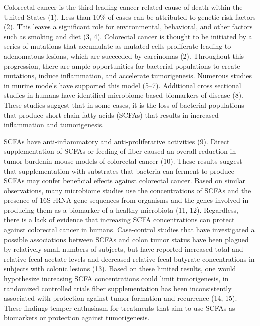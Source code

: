 \documentclass[11pt,]{article}
\begin{document}
\newpage

Colorectal cancer is the third leading cancer-related cause of death
within the United States (1). Less than 10\% of cases can be attributed
to genetic risk factors (2). This leaves a significant role for
environmental, behavioral, and other factors such as smoking and diet
(3, 4). Colorectal cancer is thought to be initiated by a series of
mutations that accumulate as mutated cells proliferate leading to
adenomatous lesions, which are succeeded by carcinomas (2). Throughout
this progression, there are ample opportunities for bacterial
populations to create mutations, induce inflammation, and accelerate
tumorigenesis. Numerous studies in murine models have supported this
model (5--7). Additional cross sectional studies in humans have
identified microbiome-based biomarkers of disease (8). These studies
suggest that in some cases, it is the loss of bacterial populations that
produce short-chain fatty acids (SCFAs) that results in increased
inflammation and tumorigenesis.

SCFAs have anti-inflammatory and anti-proliferative activities (9).
Direct supplementation of SCFAs or feeding of fiber caused an overall
reduction in tumor burdenin mouse models of colorectal cancer (10).
These results suggest that supplementation with substrates that bacteria
can ferment to produce SCFAs may confer beneficial effects against
colorectal cancer. Based on similar observations, many microbiome
studies use the concentrations of SCFAs and the presence of 16S rRNA
gene sequences from organisms and the genes involved in producing them
as a biomarker of a healthy microbiota (11, 12). Regardless, there is a
lack of evidence that increasing SCFA concentrations can protect against
colorectal cancer in humans. Case-control studies that have investigated
a possible associations between SCFAs and colon tumor status have been
plagued by relatively small numbers of subjects, but have reported
increased total and relative fecal acetate levels and decreased relative
fecal butyrate concentrations in subjects with colonic lesions (13).
Based on these limited results, one would hypothesize increasing SCFA
concentrations could limit tumorigenesis, in randomized controlled
trials fiber supplementation has been inconsistently associated with
protection against tumor formation and recurrence (14, 15). These
findings temper enthusiasm for treatments that aim to use SCFAs as
biomarkers or protection against tumorigenesis.
\end{document}
